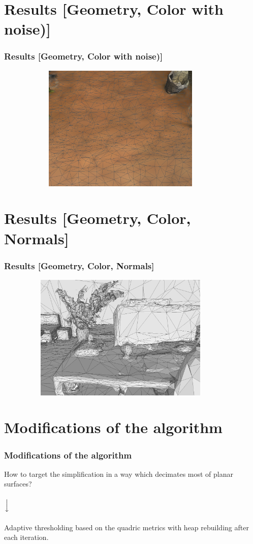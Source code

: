 \documentclass[
	10pt,
	t		%
]{beamer}
\begin{document}
\section{Results [Geometry, Color with noise)]}
\begin{frame}
\frametitle{Results [Geometry, Color with noise)]}
\centering
\begin{figure}[ht]
\centering
\includegraphics[width=10cm,height=6cm]{nosiy_floor}
\end{figure}
\end{frame}

\section{Results [Geometry, Color, Normals]}
\begin{frame}
\frametitle{Results [Geometry, Color, Normals]}
\centering
\begin{figure}[ht]
\centering
\includegraphics[width=10cm,height=6cm]{desk}
\end{figure}
\end{frame}

\section{Modifications of the algorithm}
\begin{frame}
\frametitle{Modifications of the algorithm}
\centering
How to target the simplification in a way which decimates most of planar surfaces?\\~\\
$\Big\downarrow$\\~\\
Adaptive thresholding based on the quadric metrics with heap rebuilding after each iteration.
\end{frame}
\end{document}
